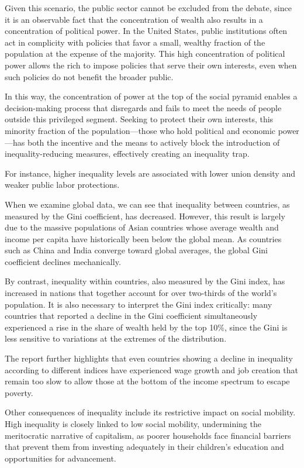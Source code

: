 Given this scenario, the public sector cannot be excluded from the debate, since it is an observable fact that the concentration of wealth also results in a concentration of political power. In the United States, public institutions often act in complicity with policies that favor a small, wealthy fraction of the population at the expense of the majority. This high concentration of political power allows the rich to impose policies that serve their own interests, even when such policies do not benefit the broader public.

In this way, the concentration of power at the top of the social pyramid enables a decision-making process that disregards and fails to meet the needs of people outside this privileged segment. Seeking to protect their own interests, this minority fraction of the population—those who hold political and economic power—has both the incentive and the means to actively block the introduction of inequality-reducing measures, effectively creating an inequality trap.

For instance, higher inequality levels are associated with lower union density and weaker public labor protections.

When we examine global data, we can see that inequality between countries, as measured by the Gini coefficient, has decreased. However, this result is largely due to the massive populations of Asian countries whose average wealth and income per capita have historically been below the global mean. As countries such as China and India converge toward global averages, the global Gini coefficient declines mechanically.

By contrast, inequality within countries, also measured by the Gini index, has increased in nations that together account for over two-thirds of the world’s population. It is also necessary to interpret the Gini index critically: many countries that reported a decline in the Gini coefficient simultaneously experienced a rise in the share of wealth held by the top 10\%, since the Gini is less sensitive to variations at the extremes of the distribution.

The report further highlights that even countries showing a decline in inequality according to different indices have experienced wage growth and job creation that remain too slow to allow those at the bottom of the income spectrum to escape poverty.

Other consequences of inequality include its restrictive impact on social mobility. High inequality is closely linked to low social mobility, undermining the meritocratic narrative of capitalism, as poorer households face financial barriers that prevent them from investing adequately in their children’s education and opportunities for advancement.

